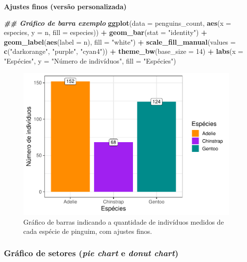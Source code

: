 \documentclass[
]{article}
\newenvironment{Shaded}{\begin{snugshade}}{\end{snugshade}}
\newcommand{\AttributeTok}[1]{\textcolor[rgb]{0.13,0.29,0.53}{#1}}
\newcommand{\DecValTok}[1]{\textcolor[rgb]{0.00,0.00,0.81}{#1}}
\newcommand{\DocumentationTok}[1]{\textcolor[rgb]{0.56,0.35,0.01}{\textbf{\textit{#1}}}}
\newcommand{\FunctionTok}[1]{\textcolor[rgb]{0.13,0.29,0.53}{\textbf{#1}}}
\newcommand{\NormalTok}[1]{#1}
\newcommand{\SpecialCharTok}[1]{\textcolor[rgb]{0.81,0.36,0.00}{\textbf{#1}}}
\newcommand{\StringTok}[1]{\textcolor[rgb]{0.31,0.60,0.02}{#1}}
\begin{document}
\textbf{Ajustes finos (versão personalizada)}

\begin{Shaded}
\begin{Highlighting}[]
\DocumentationTok{\#\# Gráfico de barra exemplo}
\FunctionTok{ggplot}\NormalTok{(}\AttributeTok{data =}\NormalTok{ penguins\_count, }\FunctionTok{aes}\NormalTok{(}\AttributeTok{x =}\NormalTok{ especies, }\AttributeTok{y =}\NormalTok{ n, }\AttributeTok{fill =}\NormalTok{ especies)) }\SpecialCharTok{+}
    \FunctionTok{geom\_bar}\NormalTok{(}\AttributeTok{stat =} \StringTok{"identity"}\NormalTok{) }\SpecialCharTok{+}
    \FunctionTok{geom\_label}\NormalTok{(}\FunctionTok{aes}\NormalTok{(}\AttributeTok{label =}\NormalTok{ n), }\AttributeTok{fill =} \StringTok{"white"}\NormalTok{) }\SpecialCharTok{+}
    \FunctionTok{scale\_fill\_manual}\NormalTok{(}\AttributeTok{values =} \FunctionTok{c}\NormalTok{(}\StringTok{"darkorange"}\NormalTok{, }\StringTok{"purple"}\NormalTok{, }\StringTok{"cyan4"}\NormalTok{)) }\SpecialCharTok{+}
    \FunctionTok{theme\_bw}\NormalTok{(}\AttributeTok{base\_size =} \DecValTok{14}\NormalTok{) }\SpecialCharTok{+}
    \FunctionTok{labs}\NormalTok{(}\AttributeTok{x =} \StringTok{"Espécies"}\NormalTok{, }\AttributeTok{y =} \StringTok{"Número de indivíduos"}\NormalTok{, }\AttributeTok{fill =} \StringTok{"Espécies"}\NormalTok{)}
\end{Highlighting}
\end{Shaded}

\begin{figure}
\includegraphics[width=0.75\linewidth,height=0.75\textheight]{epr_files/figure-latex/fig-bar-species-fino-1} \caption{Gráfico de barras indicando a quantidade de indivíduos medidos de cada espécie de pinguim, com ajustes finos.}\label{fig:fig-bar-species-fino}
\end{figure}

\hypertarget{gruxe1fico-de-setores-pie-chart-e-donut-chart}{%
\subsubsection{\texorpdfstring{Gráfico de setores (\emph{pie chart} e \emph{donut chart})}{Gráfico de setores (pie chart e donut chart)}}\label{gruxe1fico-de-setores-pie-chart-e-donut-chart}}
\end{document}
